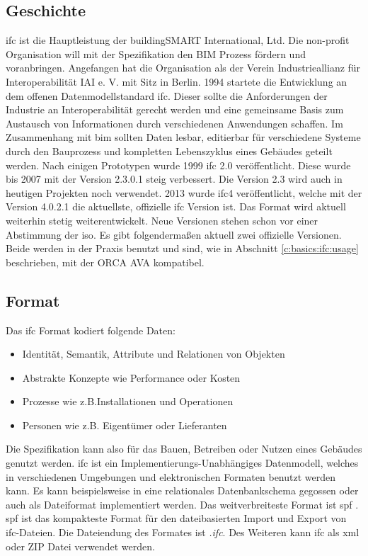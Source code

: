 \subsection{Geschichte}
\label{c:basics:ifc:history}
\ac{ifc} ist die Hauptleistung der buildingSMART International, Ltd.  Die non-profit Organisation will mit der Spezifikation den BIM Prozess fördern und voranbringen. \citep{BuildingSMART_IFC}
Angefangen hat die Organisation als der Verein Industrieallianz für Interoperabilität IAI e. V. mit Sitz in Berlin. 1994 startete die Entwicklung an dem offenen Datenmodellstandard \ac{ifc}. Dieser sollte die Anforderungen der Industrie an Interoperabilität gerecht werden und eine gemeinsame Basis zum Austausch von Informationen durch verschiedenen Anwendungen schaffen. Im Zusammenhang mit \ac{bim} sollten Daten lesbar, editierbar für verschiedene Systeme durch den Bauprozess und kompletten Lebenszyklus eines Gebäudes geteilt werden. \citep{Laakso2012-oi} Nach einigen Prototypen wurde 1999 \ac{ifc} 2.0 veröffentlicht. Diese wurde bis 2007 mit der Version 2.3.0.1 steig verbessert. Die Version 2.3 wird auch in heutigen Projekten noch verwendet. 2013 wurde \ac{ifc}4 veröffentlicht, welche mit der Version 4.0.2.1 die aktuellste, offizielle \ac{ifc} Version ist. Das Format wird aktuell weiterhin stetig weiterentwickelt. Neue Versionen stehen schon vor einer Abstimmung der \ac{iso}. \citep{BuildingSMART_history_2022} Es gibt folgendermaßen aktuell zwei offizielle Versionen. Beide werden in der Praxis benutzt und sind, wie in Abschnitt \ref{c:basics:ifc:usage} beschrieben, mit der ORCA AVA kompatibel.


\subsection{Format}
\label{c:basics:ifc:format}
Das \ac{ifc} Format kodiert folgende Daten:
\begin{itemize}
	\item Identität, Semantik, Attribute und Relationen von Objekten
	\item Abstrakte Konzepte wie Performance oder Kosten
	\item Prozesse wie z.B.Installationen und Operationen
	\item Personen wie z.B. Eigentümer oder Lieferanten
\end{itemize}
Die Spezifikation kann also für das Bauen, Betreiben oder Nutzen eines Gebäudes genutzt werden. \ac{ifc} ist ein Implementierungs-Unabhängiges Datenmodell, welches in verschiedenen Umgebungen und elektronischen Formaten benutzt werden kann. Es kann beispielsweise in eine relationales Datenbankschema gegossen oder auch als Dateiformat implementiert werden. Das weitverbreiteste Format ist \ac{spf} \citep{Laakso2012-oi,BuildingSMART_IFC}. \ac{spf} ist das kompakteste Format für den dateibasierten Import und Export von \ac{ifc}-Dateien. Die Dateiendung des Formates ist \glqq \textit{.ifc}\grqq{}. Des Weiteren kann \ac{ifc} als \ac{xml} oder ZIP Datei verwendet werden. \citep{BuildingSMART_IFC}

